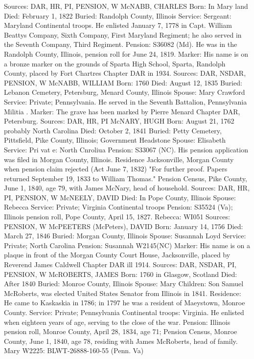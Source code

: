 Sources: DAR, HR, PI, PENSION, W 
McNABB, CHARLES 
Born: In Mary land
Died: February 1, 1822
Buried: Randolph County, Illinois 
Service: Sergeant: Maryland Continental troops. He enlisted January 7, 1778 in Capt. William Beattys Company, Sixth Company, First Maryland Regiment; he also served in the Seventh Company, Third Regiment. 
Pension: S36082 (Md). He was in the Randolph County, Illinois, pension roll for June 24, 1819.
Marker: His name is on a bronze marker on the grounds of Sparta High School, Sparta, Randolph  County, placed by Fort Chartres Chapter DAR in 1934.
Sources: DAR, NSDAR, PENSION, W 
McNABB, WILLIAM 
Born: 1760
Died: August 12, 1835
Buried: Lebanon Cemetery, Petersburg, Menard County, Illinois
Spouse: Mary Crawford
Service: Private; Pennsylvania. He served in the Seventh Battalion, Pennsylvania Militia .
Marker: The grave has been marked by Pierre Menard Chapter DAR, Petersburg.
Sources: DAR, HR, PI 
McNARY, HUGH 
Born: August 21, 1762 probably North Carolina
Died: October 2, 1841 
Buried: Petty Cemetery, Pittsfield, Pike County, Illinois; Government Headstone
Spouse: Elisabeth
Service: Pri vat e: North Cnroliua
Pension: S33067 (NC). His pension application was filed in Morgan County, Illinois. Residence Jacksonville, Morgan County when pension claim rejected (Act June 7, 1832) "For further proof. Papers returned September 19, 1833 to William Thomas." Pension Census, Pike County, June 1, 1840, age 79, with James McNary, head of household. 
Sources: DAR, HR, PI, PENSION, W 
McNEELY, DAVID
Died: In Pope County, Illinois
Spouse: Rebecca 
Service: Private; Virginia Continental troops 
Pension: S35524 (Va); Illinois pension roll, Pope County, April 15, 1827. Rebecca: WI051
Sources: PENSION, W 
McPEETERS (McPeters), DAVID 
Born: January 14, 1756 
Died: March 27, 1846
Buried: Morgan County, Illinois 
Spouse: Susannah Loyd 
Service: Private; North Carolina 
Pension: Susannah W2145(NC) 
Marker: His name is on a plaque in front of the Morgan County Court House, Jacksonville, placed by Reverend James Caldwell Chapter DAR ill 1914.
Sources: DAR, NSDAR, PI, PENSION, W 
McROBERTS, JAMES
Born: 1760 in Glasgow, Scotland
Died: After 1840 
Buried: Monroe County, Illinois
Spouse: Mary
Children: Son Samuel McRoberts, was elected United States Senator from Illinois in 1841.
Residence: He came to Kaskaskia in 1786; in 1797 he was a resident of Maeys­town, Monroe County.
Service: Private; Pennsylvania Continental troops: Virginia. He enlisted when eighteen years of age, serving to the close of the war.
Pension: Illinois pension roll, Monroe County, April 28, 1834, age 71; Pension Census, Monroe County, June 1, 1840, age 78, residing with James McRoberts, head of family. Mary W2225: BLWT-26888-160-55 (Penn. Va)
